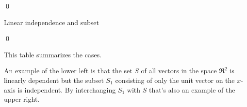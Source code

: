 \documentclass[10pt,t]{beamer}
\begin{document}
\begin{frame}

\pause
\pf
{}
\qed
\end{frame}




\begin{frame}{Linear independence and subset}
\lm[le:SubsetPreserveLI]

\pf
{}
\qed

\pause
\medskip
This table summarizes the cases.
\medskip

An example of the lower left is that the set $S$ of all vectors in the
space $\Re^2$ is linearly dependent but the subset $S_1$ consisting of only the 
unit vector on the $x$-axis is independent.
By interchanging $S_1$ with $S$ that's also an example of the upper right.
\end{frame}



% 
\end{document}
